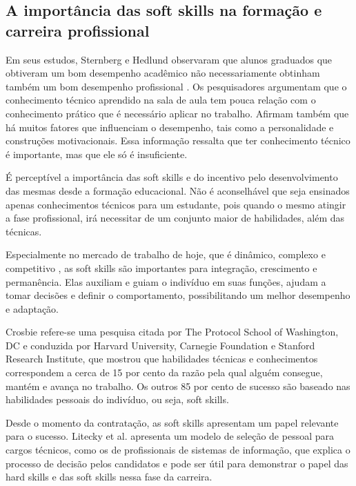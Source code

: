 	
\subsection{A importância das soft skills na formação e carreira profissional}

Em seus estudos, Sternberg e Hedlund observaram que alunos graduados que obtiveram um bom desempenho acadêmico não necessariamente obtinham também um bom desempenho profissional \cite{sternberg:02}. Os pesquisadores argumentam que o conhecimento técnico aprendido na sala de aula tem pouca relação com o conhecimento prático que é necessário aplicar no trabalho. Afirmam também que há muitos fatores que influenciam o desempenho, tais como a personalidade e construções motivacionais. Essa informação ressalta que ter conhecimento técnico é importante, mas que ele só é insuficiente. 

É perceptível a importância das soft skills e do incentivo pelo desenvolvimento das mesmas desde a formação educacional. Não é aconselhável que seja ensinados apenas conhecimentos técnicos para um estudante, pois quando o mesmo atingir a fase profissional, irá necessitar de um conjunto maior de habilidades, além das técnicas.

Especialmente no mercado de trabalho de hoje, que é dinâmico, complexo e competitivo \cite{joseph:10}, as soft skills são importantes para integração, crescimento e permanência. Elas auxiliam e guiam o indivíduo em suas funções, ajudam a tomar decisões e definir o comportamento, possibilitando um melhor desempenho e adaptação. 

Crosbie \cite{crosbie:05} refere-se uma pesquisa citada por The Protocol School of Washington, DC e conduzida por Harvard University, Carnegie Foundation e Stanford Research Institute, que mostrou que habilidades técnicas e conhecimentos correspondem a cerca de 15 por cento da razão pela qual alguém consegue, mantém e avança no trabalho. Os outros 85 por cento de sucesso são baseado nas habilidades pessoais do indivíduo, ou seja, soft skills.

Desde o momento da contratação, as soft skills apresentam um papel relevante para o sucesso. Litecky et al.\cite{litecky:04} apresenta um modelo de seleção de pessoal para cargos técnicos, como os de profissionais de sistemas de informação, que explica o processo de decisão pelos candidatos e pode ser útil para demonstrar o papel das hard skills e das soft skills nessa fase da carreira.

